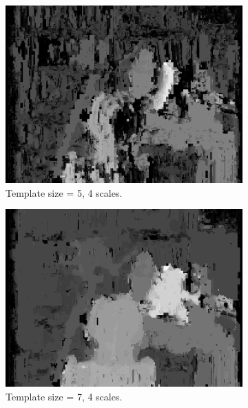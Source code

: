 \documentclass[12pt,a4paper,oneside,final]{article}
\begin{document}
\begin{table}[H]
\begin{subtable}{1\textwidth}
\begin{figure}[H]
\begin{subfigure}[b]{0.24\textwidth}
			\includegraphics[width=\textwidth]{disparity_s4_k5set_1.png}
			\caption{Template size = 5, 4 scales.}
		\end{subfigure}
		\begin{subfigure}[b]{0.24\textwidth}
			\includegraphics[width=\textwidth]{disparity_s4_k7set_1.png}
			\caption{Template size = 7, 4 scales.}
		\end{subfigure}
		\begin{subfigure}[b]{0.24\textwidth}

\end{subfigure}
\end{figure}
\end{subtable}
\end{table}
\end{document}
